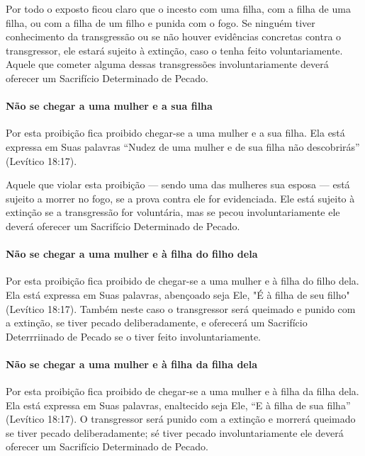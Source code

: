 Por todo o exposto ficou claro que o incesto com uma filha, com a filha de uma filha, ou com a filha de um filho e punida com o fogo. Se
ninguém tiver conhecimento da transgressão ou se não houver evidências
concretas contra o transgressor, ele estará sujeito à extinção, caso o
tenha feito voluntariamente. Aquele que cometer alguma dessas
transgressões involuntariamente deverá oferecer um Sacrifício
Determinado de Pecado.

\paragraph{Não se chegar a uma mulher e a sua filha}

Por esta proibição fica proibido chegar-se a uma mulher e a sua filha.
Ela está expressa em Suas palavras ``Nudez de uma mulher e de sua filha
não descobrirás'' (Levítico 18:17).

Aquele que violar esta proibição --- sendo uma das mulheres sua esposa
--- está sujeito a morrer no fogo, se a prova contra ele for
evidenciada. Ele está sujeito à extinção se a transgressão for
voluntária, mas se pecou involuntariamente ele deverá oferecer um
Sacrifício Determinado de Pecado.

\paragraph{Não se chegar a uma mulher e à filha do filho dela}

Por esta proibição fica proibido de chegar-se a uma mulher e à filha do
filho dela. Ela está expressa em Suas palavras, abençoado seja Ele, "É à
filha de seu filho" (Levítico 18:17). Também neste caso o transgressor
será queimado e punido com a extinção, se tiver pecado deliberadamente,
e oferecerá um Sacrifício Deterrriinado de Pecado se o tiver feito
involuntariamente.

\paragraph{Não se chegar a uma mulher e à filha da filha dela}

Por esta proibição fica proibido de chegar-se a uma mulher e à filha da
filha dela. Ela está expressa em Suas palavras, enaltecido seja Ele, ``E
à filha de sua filha'' (Levítico 18:17). O transgressor será punido com
a extinção e morrerá queimado se tiver pecado deliberadamente; sé tiver
pecado involuntariamente ele deverá oferecer um Sacrifício Determinado
de Pecado.

